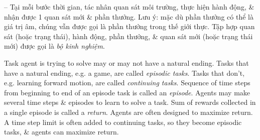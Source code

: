 \documentclass{article}
\begin{document}
\begin{itemize}
\begin{itemize}
\begin{itemize}
            -- Tại mỗi bước thời gian, tác nhân quan sát môi trường, thực hiện hành động, \& nhận được 1 quan sát mới \& phần thưởng. Lưu ý: mặc dù phần thưởng có thể là giá trị âm, chúng vẫn được gọi là phần thưởng trong thế giới thực. Tập hợp quan sát (hoặc trạng thái), hành động, phần thưởng, \& quan sát mới (hoặc trạng thái mới) được gọi là {\it bộ kinh nghiệm}.

            Task agent is trying to solve may or may not have a natural ending. Tasks that have a natural ending, e.g. a game, are called {\it episodic tasks}. Tasks that don't, e.g. learning forward motion, are called {\it continuing tasks}. Sequence of time steps from beginning to end of an episode task is called an {\it episode}. Agents may make several time steps \& episodes to learn to solve a task. Sum of rewards collected in a single episode is called a {\it return}. Agents are often designed to maximize return. A time step limit is often added to continuing tasks, so they become episodic tasks, \& agents can maximize return.


\end{itemize}
\end{itemize}
\end{itemize}
\end{document}
